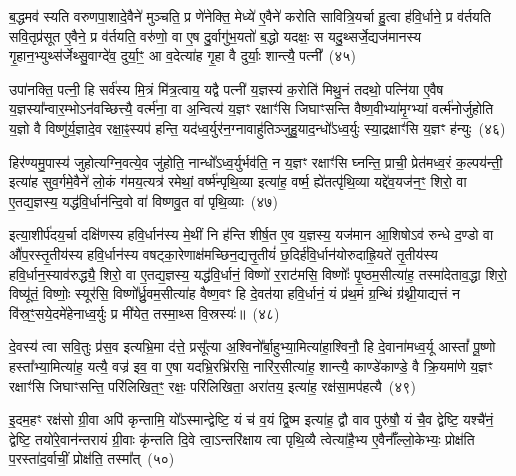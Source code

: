 {\anuvakamend[{वि॒त्त्वा दे॑वय॒त ए॒षाम॑ब्रुव॒न्॒ यानि॒ चतु॑श्चत्वारिꣳशच्च}]}%

ब॒द्धमव॑ स्यति वरुणपा॒शादे॒वैने॑ मुञ्चति॒ प्र णे॑नेक्ति॒ मेध्ये॑ ए॒वैने॑ करोति सावित्रि॒यर्चा हु॒त्वा ह॑वि॒र्धाने॒ प्र व॑र्तयति सवि॒तृप्र॑सूत ए॒वैने॒ प्र व॑र्तयति॒ वरु॑णो॒ वा ए॒ष दु॒र्वागु॑भ॒यतो॑ ब॒द्धो यदक्षः॒ स यदु॒थ्सर्जे॒द्यज॑मानस्य गृ॒हान॒भ्युथ्स॑र्जेथ्सु॒वाग्दे॑व॒ दुर्या॒ꣳ॒ आ व॒देत्या॑ह गृ॒हा वै दुर्याः॒ शान्त्यै॒ पत्नी᳚~(४५)

उपा॑नक्ति॒ पत्नी॒ हि सर्व॑स्य मि॒त्रं मि॑त्र॒त्वाय॒ यद्वै पत्नी॑ य॒ज्ञस्य॑ क॒रोति॑ मिथु॒नं तदथो॒ पत्नि॑या ए॒वैष य॒ज्ञस्या᳚न्वार॒म्भो\-ऽन॑वच्छित्त्यै॒ वर्त्म॑ना॒ वा अ॒न्वित्य॑ य॒ज्ञꣳ रक्षाꣳ॑सि जिघाꣳसन्ति वैष्ण॒वीभ्या॑मृ॒ग्भ्यां वर्त्म॑नोर्जुहोति य॒ज्ञो वै विष्णु॑र्य॒ज्ञादे॒व रक्षा॒ꣴ॒स्यप॑ हन्ति॒ यद॑ध्व॒र्युर॑न॒ग्नावाहु॑तिञ्जुहु॒याद॒न्धो᳚\-ऽध्व॒र्युः स्या॒द्रक्षाꣳ॑सि य॒ज्ञꣳ ह॑न्युः~(४६)

हिर॑ण्यमु॒पास्य॑ जुहोत्यग्नि॒वत्ये॒व जु॑होति॒ नान्धो᳚\-ऽध्व॒र्युर्भव॑ति॒ न य॒ज्ञꣳ रक्षाꣳ॑सि घ्नन्ति॒ प्राची॒ प्रेत॑मध्व॒रं क॒ल्पय॑न्ती॒ इत्या॑ह सुव॒र्गमे॒वैने॑ लो॒कं ग॑मय॒त्यत्र॑ रमेथां॒ वर्ष्म॑न्पृथि॒व्या इत्या॑ह॒ वर्ष्म॒ ह्ये॑तत्पृ॑थि॒व्या यद्दे॑व॒यज॑न॒ꣳ॒ शिरो॒ वा ए॒तद्य॒ज्ञस्य॒ यद्ध॑वि॒र्धान॑न्दि॒वो वा॑ विष्णवु॒त वा॑ पृथि॒व्याः~(४७)

इत्या॒शीर्प॑दय॒र्चा दक्षि॑णस्य हवि॒र्धान॑स्य मे॒थीं नि ह॑न्ति शीर्\mbox{}ष॒त ए॒व य॒ज्ञस्य॒ यज॑मान आ॒शिषो\-ऽव॑ रुन्धे द॒ण्डो वा औ॑प॒रस्तृ॒तीय॑स्य हवि॒र्धान॑स्य वषट्का॒रेणाक्ष॑मच्छिन॒द्यत्तृ॒तीयं॑ छ॒दिर्\mbox{}ह॑वि॒र्धान॑योरुदाह्रि॒यते॑ तृ॒तीय॑स्य हवि॒र्धान॒स्याव॑रुद्ध्यै॒ शिरो॒ वा ए॒तद्य॒ज्ञस्य॒ यद्ध॑वि॒र्धानं॒ विष्णो॑ र॒राट॑मसि॒ विष्णोः᳚ पृ॒ष्ठम॒सीत्या॑ह॒ तस्मा॑देताव॒द्धा शिरो॒ विष्यू॑तं॒ विष्णोः॒ स्यूर॑सि॒ विष्णो᳚र्ध्रु॒वम॒सीत्या॑ह वैष्ण॒वꣳ हि दे॒वत॑या हवि॒र्धानं॒ यं प्र॑थ॒मं ग्र॒न्थिं ग्र॑थ्नी॒याद्यत्तं न वि॑स्र॒ꣳ॒सये॒दमे॑हेनाध्व॒र्युः प्र मी॑येत॒ तस्मा॒थ्स वि॒स्रस्यः॑॥~(४८)

{\anuvakamend[{पत्नी॑ हन्युर्वा पृथि॒व्या विष्यू॑तं॒ विष्णोः॒ षड्विꣳ॑शतिश्च}]}%

दे॒वस्य॑ त्वा सवि॒तुः प्र॑स॒व इत्यभ्रि॒मा द॑त्ते॒ प्रसू᳚त्या अ॒श्विनो᳚र्बा॒हुभ्या॒मित्या॑हा॒श्विनौ॒ हि दे॒वाना॑मध्व॒र्यू आस्तां᳚ पू॒ष्णो हस्ता᳚भ्या॒मित्या॑ह॒ यत्यै॒ वज्र॑ इव॒ वा ए॒षा यदभ्रि॒रभ्रि॑रसि॒ नारि॑र॒सीत्या॑ह॒ शान्त्यै॒ काण्डे॑काण्डे॒ वै क्रि॒यमा॑णे य॒ज्ञꣳ रक्षाꣳ॑सि जिघाꣳसन्ति॒ परि॑लिखित॒ꣳ॒ रक्षः॒ परि॑लिखिता॒ अरा॑तय॒ इत्या॑ह॒ रक्ष॑सा॒मप॑हत्यै~(४९)

इ॒दम॒हꣳ रक्ष॑सो ग्री॒वा अपि॑ कृन्तामि॒ यो᳚\-ऽस्मान्द्वेष्टि॒ यं च॑ व॒यं द्वि॒ष्म इत्या॑ह॒ द्वौ वाव पुरु॑षौ॒ यं चै॒व द्वेष्टि॒ यश्चै॑नं॒ द्वेष्टि॒ तयो॑रे॒वान॑न्तरायं ग्री॒वाः कृ॑न्तति दि॒वे त्वा॒ऽन्तरि॑क्षाय त्वा पृथि॒व्यै त्वेत्या॑है॒भ्य ए॒वैनाँ᳚ल्लो॒केभ्यः॒ प्रोक्ष॑ति प॒रस्ता॑द॒र्वाचीं॒ प्रोक्ष॑ति॒ तस्मा᳚त्~(५०)

